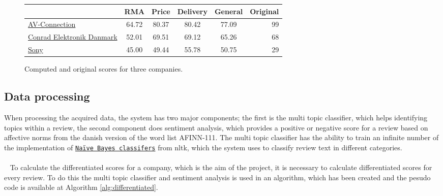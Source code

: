 \documentclass[10pt]{IEEEtran}
\begin{document}
\begin{figure*}[!ht]
	\vspace*{10mm}
	\hspace*{25mm}	
	\begin{tabular}{ | l | c | c | c | c | r | }
  		\hline
   		 & \textbf{RMA} & \textbf{Price} & \textbf{Delivery} & \textbf{General} & \textbf{Original} \\ \hline
  		\href{http://www.trustpilot.dk/review/www.av-connection.dk}{AV-Connection} & 64.72 & 80.37 & 80.42 & 77.09 & 99 \\ \hline
  		\href{http://www.trustpilot.dk/review/www.conradelektronik.dk}{Conrad Elektronik Danmark} & 52.01 & 69.51 & 69.12 & 65.26 & 68 \\ \hline
  		\href{http://www.trustpilot.dk/review/www.sony.dk}{Sony}  & 45.00 & 49.44 & 55.78 & 50.75 & 29 \\ \hline
	\end{tabular}
	\hspace*{30mm}	
	\caption{Computed and original scores for three companies. \label{fig:scores}}
\end{figure*}

\subsection{Data processing}
When processing the acquired data, the system has two major components; the first is the multi topic classifier, which helps identifying topics within a review, the second component does sentiment analysis, which provides a positive or negative score for a review based on affective norms from the danish version of the word list AFINN-111\cite{IMM2011-06010}. The multi topic classifier has the ability to train an infinite number of the implementation of \href{http://nltk.org/api/nltk.classify.html#module-nltk.classify.naivebayes}{\texttt{Naïve Bayes classifers}} from nltk, which the system uses to classify review text in different categories.
\\~
\\~
To calculate the differentiated scores for a company, which is the aim of the project, it is necessary to calculate differentiated scores for every review. To do this the multi topic classifier and sentiment analysis is used in an algorithm, which has been created and the pesudo code is available at Algorithm \ref{alg:differentiated}.
\end{document}
